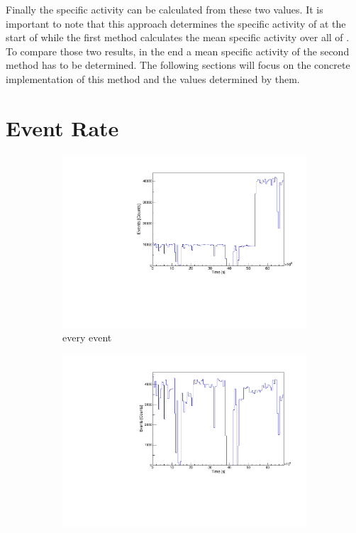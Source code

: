 Finally the specific activity can be calculated from these two values.
It is important to note that this approach determines the specific activity of \Kr at the start of \PII while the first method calculates the mean specific activity over all of \PII.
To compare those two results, in the end a mean specific activity of the second method has to be determined.
The following sections will focus on the concrete implementation of this method and the values determined by them.
\\

\section{Event Rate}
\label{sec:EventAct}

\begin{figure}[t!]
	\centering
	\begin{subfigure}{.5\textwidth}
		\centering
		\includegraphics[width=\textwidth]{./Bilder/ZeitverlaufALLE.pdf}
		\caption{every event}
		\label{fig:ZeitAll}
	\end{subfigure}%
	\begin{subfigure}{.5\textwidth}
		\centering
		\includegraphics[width=\textwidth]{./Bilder/ZeitverlaufLimits.pdf}

\end{subfigure}
\end{figure}
